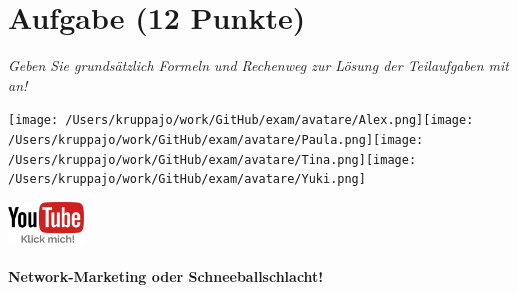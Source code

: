 \documentclass[a4paper, 9pt]{scrartcl}\usepackage[]{graphicx}\usepackage[]{xcolor}
\begin{document}
 
\clearpage

\section{Aufgabe \hfill (12 Punkte)}

\textit{Geben Sie grundsätzlich Formeln und Rechenweg zur Lösung der Teilaufgaben mit an!} \\[1Ex]
 

 
\ifcollection
\begin{flushright}
\tiny\vspace{-3Ex}
\textbf{\examinhaltstart}
\exammodulemathstat
\vspace{-4Ex}
\end{flushright}
\begin{minipage}[t]{0.5\textwidth}
\texttt{[image: /Users/kruppajo/work/GitHub/exam/avatare/Alex.png]}\hspace{-4mm}\texttt{[image: /Users/kruppajo/work/GitHub/exam/avatare/Paula.png]}\hspace{-4mm}\texttt{[image: /Users/kruppajo/work/GitHub/exam/avatare/Tina.png]}\hspace{-4mm}\texttt{[image: /Users/kruppajo/work/GitHub/exam/avatare/Yuki.png]}
\end{minipage}
\begin{minipage}[t]{0.5\textwidth}
\hfill
\href{https://youtu.be/SZqp_vy3rgI}{\includegraphics[width = 2cm]{img/youtube}}
\end{minipage}
\fi



\ifcollection
\paragraph{Network-Marketing oder Schneeballschlacht!}
\fi
\end{document}
